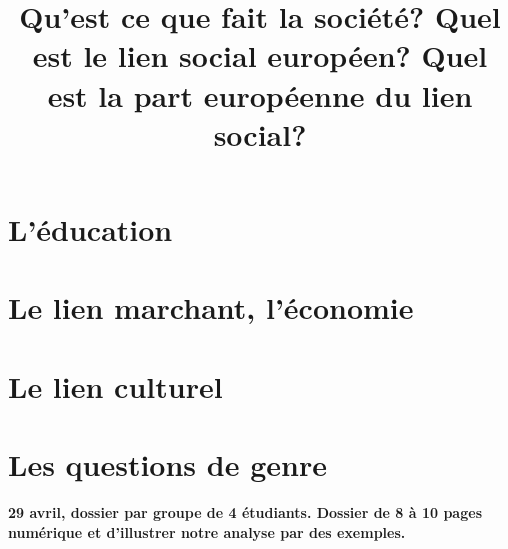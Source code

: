 \documentclass[12pt,a4paper]{report}
\begin{document}
\title{Qu'est ce que fait la société? Quel est le lien social européen? Quel est la part européenne du lien social? } 
\maketitle

\tableofcontents








\chapter{L'éducation}
\chapter{Le lien marchant, l'économie}
\chapter{Le lien culturel}
\chapter{Les questions de genre}

\textbf{29 avril, dossier par groupe de 4 étudiants.
Dossier de 8 à 10 pages numérique et d'illustrer notre analyse par des exemples.}
\end{document}
